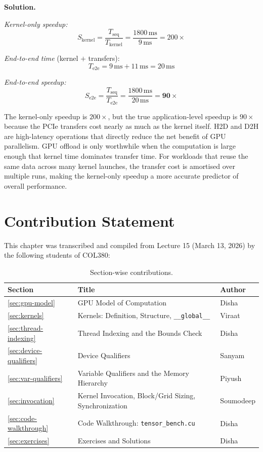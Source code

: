 \textbf{Solution.}

\textit{Kernel-only speedup:}
\[
  S_{\text{kernel}}
  = \frac{T_{\text{seq}}}{T_{\text{kernel}}}
  = \frac{1800\,\text{ms}}{9\,\text{ms}}
  = 200\times
\]

\textit{End-to-end time} (kernel $+$ transfers):
\[
  T_{\text{e2e}} = 9\,\text{ms} + 11\,\text{ms} = 20\,\text{ms}
\]

\textit{End-to-end speedup:}
\[
  S_{\text{e2e}}
  = \frac{T_{\text{seq}}}{T_{\text{e2e}}}
  = \frac{1800\,\text{ms}}{20\,\text{ms}}
  = \mathbf{90\times}
\]

The kernel-only speedup is $200\times$, but the true application-level
speedup is $90\times$ because the PCIe transfers cost nearly as much as the
kernel itself. H2D and D2H are high-latency operations that directly reduce
the net benefit of GPU parallelism. GPU offload is only worthwhile when the
computation is large enough that kernel time dominates transfer time. For
workloads that reuse the same data across many kernel launches, the transfer
cost is amortised over multiple runs, making the kernel-only speedup a more
accurate predictor of overall performance.

\section{Contribution Statement}
\label{sec:contributions}
 
This chapter was transcribed and compiled from Lecture 15 (March 13, 2026)
by the following students of COL380:
 
\begin{table}[h]
\centering
\caption{Section-wise contributions.}
\label{tab:contributions}
\begin{tabular}{lll}
\hline
\textbf{Section} & \textbf{Title} & \textbf{Author} \\
\hline
\ref{sec:gpu-model}         & GPU Model of Computation                          & Disha \\
\ref{sec:kernels}           & Kernels: Definition, Structure, \texttt{\_\_global\_\_} & Viraat \\
\ref{sec:thread-indexing}   & Thread Indexing and the Bounds Check              & Disha \\
\ref{sec:device-qualifiers} & Device Qualifiers                                 & Sanyam \\
\ref{sec:var-qualifiers}    & Variable Qualifiers and the Memory Hierarchy      & Piyush \\
\ref{sec:invocation}        & Kernel Invocation, Block/Grid Sizing, Synchronization & Soumodeep \\
\ref{sec:code-walkthrough}  & Code Walkthrough: \texttt{tensor\_bench.cu}       & Disha \\
\ref{sec:exercises}         & Exercises and Solutions                           & Disha \\
\hline
\end{tabular}
\end{table}
 